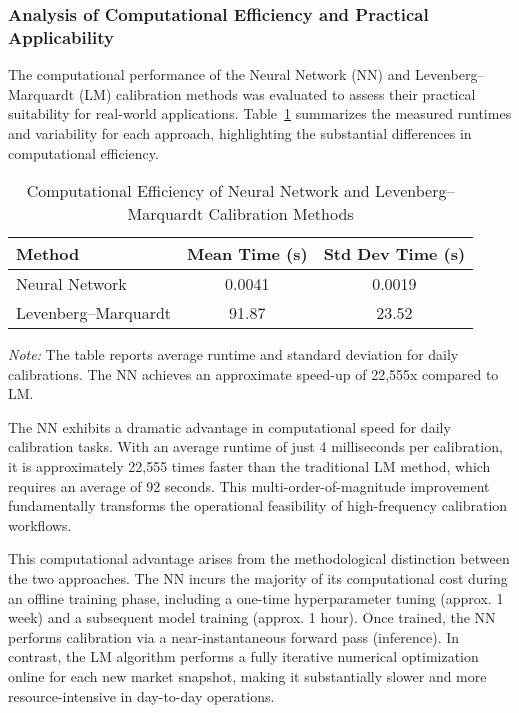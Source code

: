 \subsubsection{Analysis of Computational Efficiency and Practical Applicability}
The computational performance of the Neural Network (NN) and Levenberg–Marquardt (LM) calibration methods was evaluated to assess their practical suitability for real-world applications. Table~\ref{tab:comp_efficiency} summarizes the measured runtimes and variability for each approach, highlighting the substantial differences in computational efficiency.

\begin{table}[H]
	\centering
	\begin{threeparttable}
		\caption{Computational Efficiency of Neural Network and Levenberg–Marquardt Calibration Methods}
		\label{tab:comp_efficiency}
		\begin{tabular}{lcc}
			\toprule
			Method               & Mean Time (s) & Std Dev Time (s) \\
			\midrule
			Neural Network       & 0.0041        & 0.0019           \\
			Levenberg--Marquardt & 91.87         & 23.52            \\
			\bottomrule
		\end{tabular}
		\begin{tablenotes}
			\footnotesize
			\item \textit{Note:} The table reports average runtime and standard deviation for daily calibrations. The NN achieves an approximate speed-up of 22,555x compared to LM.
		\end{tablenotes}
	\end{threeparttable}
\end{table}

The NN exhibits a dramatic advantage in computational speed for daily calibration tasks. With an average runtime of just 4 milliseconds per calibration, it is approximately 22,555 times faster than the traditional LM method, which requires an average of 92 seconds. This multi-order-of-magnitude improvement fundamentally transforms the operational feasibility of high-frequency calibration workflows.

This computational advantage arises from the methodological distinction between the two approaches. The NN incurs the majority of its computational cost during an offline training phase, including a one-time hyperparameter tuning (approx. 1 week) and a subsequent model training (approx. 1 hour). Once trained, the NN performs calibration via a near-instantaneous forward pass (inference). In contrast, the LM algorithm performs a fully iterative numerical optimization online for each new market snapshot, making it substantially slower and more resource-intensive in day-to-day operations.

